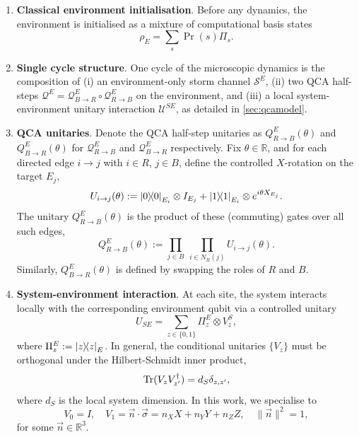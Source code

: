 \begin{enumerate}
    \item[(A1)] \textbf{Classical environment initialisation}. Before any dynamics, the environment is initialised as a mixture of computational basis states
    \begin{equation}\label{eq:initial_rho_env}
        \rho_E = \sum_s \Pr(s) \Pi_s.
    \end{equation}

    \item[(A2)] \textbf{Single cycle structure}. One cycle of the microscopic dynamics is the composition of (i) an environment-only storm channel \(\mathcal{S}^E\), (ii) two QCA half-steps \(\mathcal{Q}^E = \mathcal{Q}_{B\to R}^E \circ \mathcal{Q}_{R\to B}^E\) on the environment, and (iii) a local system-environment unitary interaction \(\mathcal{U}^{SE}\), as detailed in \cref{sec:qcamodel}.
    
    \item[(A3)] \textbf{QCA unitaries}. Denote the QCA half-step unitaries as \(Q_{R\to B}^E(\theta)\) and \(Q_{B\to R}^E(\theta)\) for \(\mathcal{Q}_{R\to B}^E\) and \(\mathcal{Q}_{B\to R}^E\) respectively. Fix \(\theta \in \mathbb{R}\), and for each directed edge \(i \to j\) with \(i \in R\), \(j \in B\), define the controlled \(X\)-rotation on the target \(E_j\),
    \begin{equation}
        U_{i\to j}(\theta):=\ket{0}\!\!\bra{0}_{E_i}\otimes I_{E_j}+\ket{1}\!\!\bra{1}_{E_i}\otimes e^{i\theta X_{E_j}}.
    \end{equation}
    The unitary \(Q^{E}_{R \to B}(\theta)\) is the product of these (commuting) gates over all such edges,
    \begin{equation}
        Q^{E}_{R\to B}(\theta):=\prod_{j\in B}\ \prod_{i\in N_R(j)} U_{i\to j}(\theta).
    \end{equation}
    Similarly, \(Q^{E}_{B\to R}(\theta)\) is defined by swapping the roles of \(R\) and \(B\).

    \item[(A4)] \textbf{System-environment interaction}.
    At each site, the system interacts locally with the corresponding environment qubit via a controlled unitary
    \begin{equation}\label{eq:se-unitary}
        U_{SE}=\sum_{z\in\{0,1\}}\Pi_z^E\otimes V_z^S,
    \end{equation}
    where \(\Pi^{E}_{z}:=\ket{z}\!\!\bra{z}_E\). In general, the conditional unitaries \(\{V_z\}\) must be orthogonal under the Hilbert-Schmidt inner product,
    \begin{equation}\label{eq:hs-orthogonal}
        \mathrm{Tr}(V_zV_{z'}^\dagger) = d_S \delta_{z,z'},
    \end{equation}
    where \(d_S\) is the local system dimension. In this work, we specialise to
    \begin{equation}\label{eq:unitary-decomp}
        V_0 = I, \quad V_1 = \vec{n} \cdot \vec{\sigma} = n_X X + n_Y Y + n_Z Z, \quad \|\vec{n}\|^2 = 1,
    \end{equation}
    for some \(\vec{n} \in \mathbb{R}^3\).


\end{enumerate}
